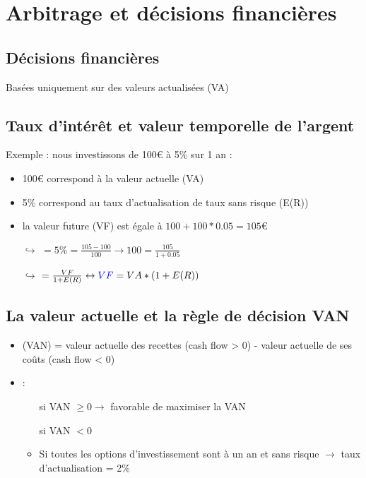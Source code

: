 \addtocounter{chapter}{1}
\chapter{Arbitrage et décisions financières}

\section{Décisions financières}

Basées uniquement sur des valeurs actualisées (VA)

\section{Taux d'intérêt et valeur temporelle de l'argent}

Exemple : nous investissons de 100€ à 5\% sur 1 an :
\begin{itemize}
    \item 100€ correspond à la valeur actuelle (VA)
    \item 5\% correspond au taux d'actualisation de taux sans risque (E(R))
    \item la valeur future (VF)  est égale à $100 + 100 * 0.05 = 105$€
\end{itemize}

\begin{itemize}
    \item[$\hookrightarrow$]  $= 5\% = \frac{105-100}{100} \rightarrow 100 = \frac{105}{1 + 0.05}$
    \item[$\hookrightarrow$]  $= \frac{VF}{1 + E(R)} \leftrightarrow \textblue{VF} = VA * (1 + E(R))$
\end{itemize}

\section{La valeur actuelle et la règle de décision VAN}

\begin{itemize}
    \item {} (VAN) = valeur actuelle des recettes (cash flow > 0) - valeur actuelle de ses coûts (cash flow < 0)
    \item {} :
    \begin{itemize}
        \item[\textgreen{V}] si VAN $\geq 0 \rightarrow$ favorable de maximiser la VAN
        \item[\textred{X}] si VAN $< 0$
        \item Si toutes les options d'investissement sont à un an et sans risque $\rightarrow$ taux d'actualisation = 2\%
    \end{itemize}
\end{itemize}

